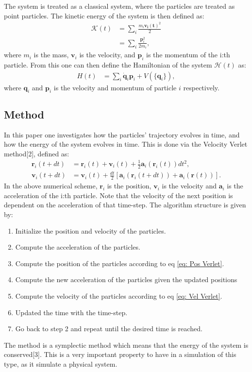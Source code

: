 \documentclass[a4paper]{article}
\newcommand{\newparagraph}{\vspace{.5cm}\noindent}
\begin{document}
\newparagraph
The system is treated as a classical system, where the particles are treated as point particles. The kinetic energy of the system is then defined as:
\begin{align*}
    \mathcal{K}(t) &= \sum_i \frac{m_i\mathbf{\mathbf{v}_i(t)}^2}{2}\\
    &=\sum_i \frac{\mathbf{p}_i^2}{2m_i},
\end{align*}where $m_i$ is the mass, $\mathbf{v}_i$ is the velocity, and $\mathbf{p}_i$ is the momentum of the i:th particle.
From this one can then define the Hamiltonian of the system $\mathcal{H}(t)$ as:
\begin{align}
    H(t) &= \sum_i \dot{\mathbf{q}}_i\mathbf{p}_i + V(\{\mathbf{q}_i\}), \label{eq: Hamiltonian}
\end{align}where $\mathbf{q}_i$ and $\mathbf{p}_i$ is the velocity and momentum of particle $i$ respectively.

\subsection{Method}
In this paper one investigates how the particles' trajectory evolves in time, and how the energy of the system evolves in time.
This is done via the Velocity Verlet method[2], defined as:
\begin{align}
    \mathbf{r}_i(t + dt) &= \mathbf{r}_i(t) + \mathbf{v}_i(t) + \frac{1}{2}\mathbf{a}_i(\mathbf{r}_i(t))dt^2,\label{eq: Pos Verlet}\\
    \mathbf{v}_i(t + dt) &= \mathbf{v}_i(t) + \frac{dt}{2}\left[\mathbf{a}_i(\mathbf{r}_i(t + dt)) + \mathbf{a}_i(\mathbf{r}(t))\right].\label{eq: Vel Verlet}
\end{align}
In the above numerical scheme, $\mathbf{r}_i$ is the position, $\mathbf{v}_i$ is the velocity and $\mathbf{a}_i$ is the acceleration of the i:th particle. Note that the velocity of the next position is dependent on the acceleration of that time-step.
The algorithm structure is given by:
\begin{enumerate}
    \item Initialize the position and velocity of the particles.
    \item Compute the acceleration of the particles.
    \item Compute the position of the particles according to eq \eqref{eq: Pos Verlet}.
    \item Compute the new acceleration of the particles given the updated positions
    \item Compute the velocity of the particles according to eq \eqref{eq: Vel Verlet}.
    \item Updated the time with the time-step.
    \item Go back to step 2 and repeat until the desired time is reached. 
\end{enumerate}
The method is a symplectic method which means that the energy of the system is conserved[3]. This is a very important property to have in a simulation of this type, as it simulate a physical system.
\end{document}
